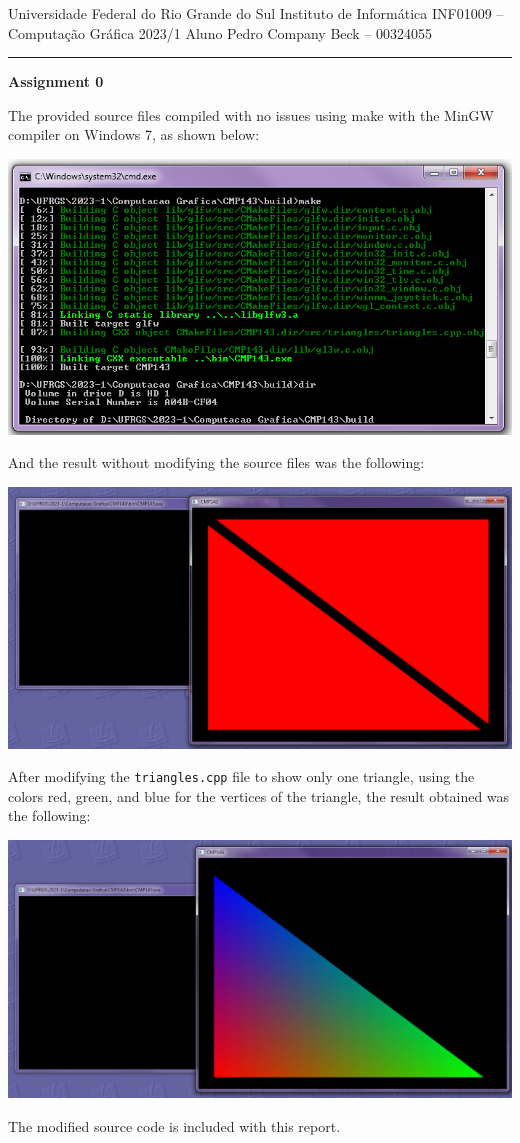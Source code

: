 \documentclass[12pt]{article}
\begin{document}
\noindent
Universidade Federal do Rio Grande do Sul \hfill Instituto de Informática \newline 
INF01009 -- Computação Gráfica \hfill 2023/1 \newline
Aluno \hfill Pedro Company Beck -- 00324055
\rule{\linewidth}{1.pt}

\begin{center}
	\LARGE\textbf{Assignment 0} 
\end{center}

The provided source files compiled with no issues using make with the MinGW compiler on Windows 7, as shown below:
\begin{center}
	\includegraphics[scale=0.5]{1.png}
\end{center}
And the result without modifying the source files was the following:
\begin{center}
	\includegraphics[scale=0.5]{2.png}
\end{center}
After modifying the \texttt{triangles.cpp} file to show only one triangle, using the colors red, green, and blue for the vertices of the triangle, the result obtained was the following:
\begin{center}
	\includegraphics[scale=0.5]{4.png}
\end{center}
The modified source code is included with this report.
\end{document}
